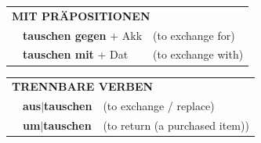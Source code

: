 \documentclass[10pt,a4paper]{revtex4-2}
\begin{document}
\begin{verbbox}
\vspace{10pt}

\begin{tabular}{lll}
\multicolumn{3}{l}{\textbf{MIT PRÄPOSITIONEN}}\\
& \textbf{tauschen gegen} + Akk & (to exchange for)\\
& \textbf{tauschen mit} + Dat & (to exchange with)\\
\end{tabular}
\hfill
\begin{tabular}{lll}
\multicolumn{3}{l}{\textbf{TRENNBARE VERBEN}}\\
& \textbf{aus$|$tauschen} & (to exchange / replace)\\
& \textbf{um$|$tauschen} & (to return (a purchased item))\\
\end{tabular}
\vspace{-5pt}
\end{verbbox}
\end{document}
